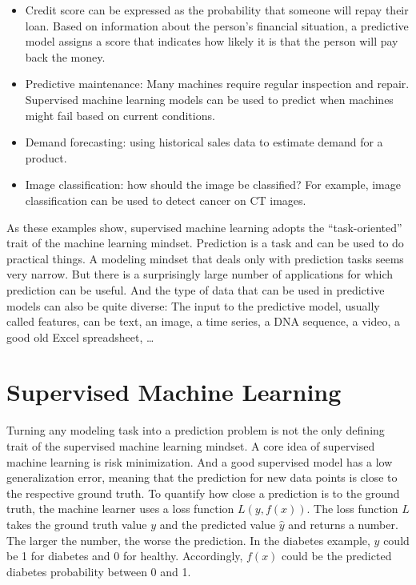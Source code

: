 \documentclass[
  10pt,
]{scrbook}
\providecommand{\tightlist}{%
  \setlength{\itemsep}{0pt}\setlength{\parskip}{0pt}}
\begin{document}
\begin{itemize}
\tightlist
\item
  Credit score can be expressed as the probability that someone will repay their loan. Based on information about the person's financial situation, a predictive model assigns a score that indicates how likely it is that the person will pay back the money.
\item
  Predictive maintenance: Many machines require regular inspection and repair. Supervised machine learning models can be used to predict when machines might fail based on current conditions.
\item
  Demand forecasting: using historical sales data to estimate demand for a product.
\item
  Image classification: how should the image be classified? For example, image classification can be used to detect cancer on CT images.
\end{itemize}

As these examples show, supervised machine learning adopts the ``task-oriented'' trait of the machine learning mindset.
Prediction is a task and can be used to do practical things.
A modeling mindset that deals only with prediction tasks seems very narrow.
But there is a surprisingly large number of applications for which prediction can be useful.
And the type of data that can be used in predictive models can also be quite diverse:
The input to the predictive model, usually called features, can be text, an image, a time series, a DNA sequence, a video, a good old Excel spreadsheet, \ldots{}

\hypertarget{supervised-machine-learning}{%
\section{Supervised Machine Learning}\label{supervised-machine-learning}}

Turning any modeling task into a prediction problem is not the only defining trait of the supervised machine learning mindset.
A core idea of supervised machine learning is risk minimization.
And a good supervised model has a low generalization error, meaning that the prediction for new data points is close to the respective ground truth.
To quantify how close a prediction is to the ground truth, the machine learner uses a loss function \(L(y, f(x))\).
The loss function \(L\) takes the ground truth value \(y\) and the predicted value \(\hat{y}\) and returns a number.
The larger the number, the worse the prediction.
In the diabetes example, \(y\) could be 1 for diabetes and 0 for healthy.
Accordingly, \(f(x)\) could be the predicted diabetes probability between 0 and 1.
\end{document}
